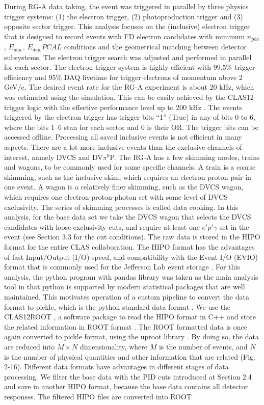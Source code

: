 During RG-A data taking, the event was triggered in parallel by three physics trigger systems: (1) the electron trigger, (2) photoproduction trigger and (3) opposite sector trigger. This analysis focuses on the (inclusive) electron trigger that is designed to record events with FD electron candidates with minimum $n_{phe}$, $E_{dep.}$, $E_{dep.} PCAL$ conditions and the geometrical matching between detector subsystems. The electron trigger search was adjusted and performed in parallel for each sector. The electron trigger system is highly efficient with 99.5\% trigger efficiency and 95\% DAQ livetime for trigger electrons of momentum above 2 GeV/c. The desired event rate for the RG-A experiment is about 20 kHz, which was estimated using the simulation. This can be easily achieved by the CLAS12 trigger logic with the effective performance level up to 200 kHz \parencite{Raydo2020TheSystem}. The events triggered by the electron trigger has trigger bits ``1'' (True) in any of bits 0 to 6, where the bits 1–6 stan for each sector and 0 is their OR. The trigger bits can be accessed offline. Processing all saved inclusive events is not efficient in many aspects. There are a lot more inclusive events than the exclusive channels of interest, namely DVCS and DV$\pi^0$P. The RG-A has a few skimming modes, trains and wagons, to be commonly used for some specific channels. A train is a coarse skimming, such as the inclusive skim, which requires an electron-proton pair in one event. A wagon is a relatively finer skimming, such as the DVCS wagon, which requires one electron-proton-photon set with some level of DVCS exclusivity. The series of skimming processes is called data cooking. In this analysis, for the base data set we take the DVCS wagon that selects the DVCS candidates with loose exclusivity cuts, and require at least one $e'p'\gamma$ set in the event  (see Section 3.3 for the cut conditions). The raw data is stored in the HIPO format  for the entire CLAS collaboration. The HIPO format has the advantages of fast Input/Output (I/O) speed, and compatibility with the Event I/O (EVIO) format that is commonly used for the Jefferson Lab event storage  \parencite{Wolin2007EVIOPackage}. For this analysis, the python program with pandas library was taken as the main analysis tool in that python is supported by modern statistical packages  that are well maintained. This motivates operation of a custom pipeline to convert the data format to pickle, which is the python standard data format . We use the CLAS12ROOT , a software package to read the HIPO format in C++ and store the related information in ROOT format . The ROOT formatted data is once again converted to pickle format, using the uproot library . By doing so, the data are reduced into $M \times N$ dimensionality, where $M$ is the number of events, and $N$ is the number of physical quantities and other information that are related (Fig. 2-16). Different data formats have advantages in different stages of data processing. We filter the base data with the PID cuts introduced at Section 2.4 and save in another HIPO format, because the base data contains all detector responses. The filtered HIPO files are converted into ROOT 